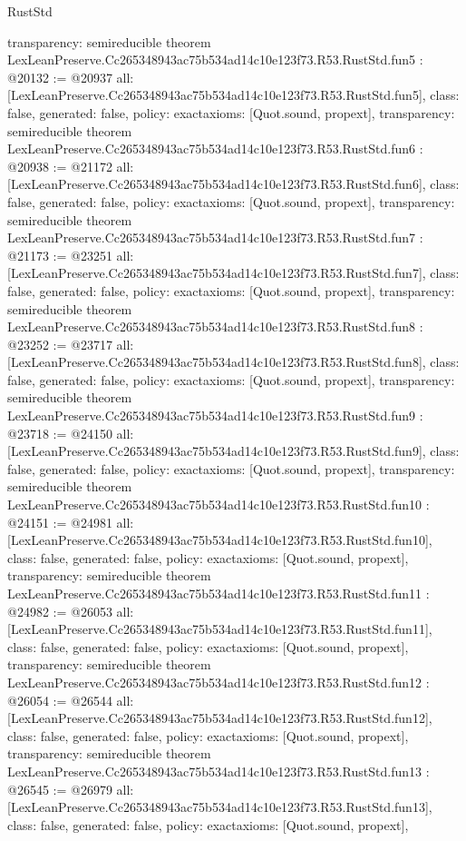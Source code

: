 \begin{lexlean}{RustStd}
\begin{coremodule}
{  transparency: semireducible
}
theorem LexLeanPreserve.Cc265348943ac75b534ad14c10e123f73.R53.RustStd.fun5 : @20132 := @20937 {
  all: [LexLeanPreserve.Cc265348943ac75b534ad14c10e123f73.R53.RustStd.fun5],
  class: false,
  generated: false,
  policy: exact{axioms: [Quot.sound, propext]},
  transparency: semireducible
}
theorem LexLeanPreserve.Cc265348943ac75b534ad14c10e123f73.R53.RustStd.fun6 : @20938 := @21172 {
  all: [LexLeanPreserve.Cc265348943ac75b534ad14c10e123f73.R53.RustStd.fun6],
  class: false,
  generated: false,
  policy: exact{axioms: [Quot.sound, propext]},
  transparency: semireducible
}
theorem LexLeanPreserve.Cc265348943ac75b534ad14c10e123f73.R53.RustStd.fun7 : @21173 := @23251 {
  all: [LexLeanPreserve.Cc265348943ac75b534ad14c10e123f73.R53.RustStd.fun7],
  class: false,
  generated: false,
  policy: exact{axioms: [Quot.sound, propext]},
  transparency: semireducible
}
theorem LexLeanPreserve.Cc265348943ac75b534ad14c10e123f73.R53.RustStd.fun8 : @23252 := @23717 {
  all: [LexLeanPreserve.Cc265348943ac75b534ad14c10e123f73.R53.RustStd.fun8],
  class: false,
  generated: false,
  policy: exact{axioms: [Quot.sound, propext]},
  transparency: semireducible
}
theorem LexLeanPreserve.Cc265348943ac75b534ad14c10e123f73.R53.RustStd.fun9 : @23718 := @24150 {
  all: [LexLeanPreserve.Cc265348943ac75b534ad14c10e123f73.R53.RustStd.fun9],
  class: false,
  generated: false,
  policy: exact{axioms: [Quot.sound, propext]},
  transparency: semireducible
}
theorem LexLeanPreserve.Cc265348943ac75b534ad14c10e123f73.R53.RustStd.fun10 : @24151 := @24981 {
  all: [LexLeanPreserve.Cc265348943ac75b534ad14c10e123f73.R53.RustStd.fun10],
  class: false,
  generated: false,
  policy: exact{axioms: [Quot.sound, propext]},
  transparency: semireducible
}
theorem LexLeanPreserve.Cc265348943ac75b534ad14c10e123f73.R53.RustStd.fun11 : @24982 := @26053 {
  all: [LexLeanPreserve.Cc265348943ac75b534ad14c10e123f73.R53.RustStd.fun11],
  class: false,
  generated: false,
  policy: exact{axioms: [Quot.sound, propext]},
  transparency: semireducible
}
theorem LexLeanPreserve.Cc265348943ac75b534ad14c10e123f73.R53.RustStd.fun12 : @26054 := @26544 {
  all: [LexLeanPreserve.Cc265348943ac75b534ad14c10e123f73.R53.RustStd.fun12],
  class: false,
  generated: false,
  policy: exact{axioms: [Quot.sound, propext]},
  transparency: semireducible
}
theorem LexLeanPreserve.Cc265348943ac75b534ad14c10e123f73.R53.RustStd.fun13 : @26545 := @26979 {
  all: [LexLeanPreserve.Cc265348943ac75b534ad14c10e123f73.R53.RustStd.fun13],
  class: false,
  generated: false,
  policy: exact{axioms: [Quot.sound, propext]},
}
\end{coremodule}
\end{lexlean}
